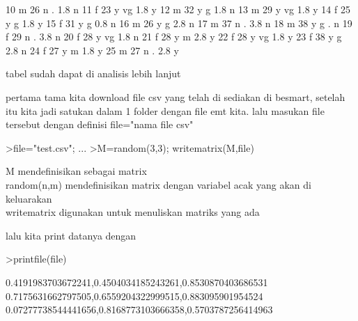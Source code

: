 \documentclass[a4paper,10pt]{article}
\begin{document}
\begin{eulernotebook}
\begin{eulercomment}
\begin{eulercomment}
\begin{eulercomment}
\begin{eulercomment}
\begin{eulercomment}
\begin{eulercomment}
\begin{eulercomment}
\begin{eulercomment}
\begin{euleroutput}
       10    m   26       n          .  1.8       n
       11    f   23       y         vg  1.8       y
       12    m   32       y          g  1.8       n
       13    m   29       y         vg  1.8       y
       14    f   25       y          g  1.8       y
       15    f   31       y          g  0.8       n
       16    m   26       y          g  2.8       n
       17    m   37       n          .  3.8       n
       18    m   38       y          g    .       n
       19    f   29       n          .  3.8       n
       20    f   28       y         vg  1.8       n
       21    f   28       y          m  2.8       y
       22    f   28       y         vg  1.8       y
       23    f   38       y          g  2.8       n
       24    f   27       y          m  1.8       y
       25    m   27       n          .  2.8       y
\end{euleroutput}
\begin{eulercomment}
tabel sudah dapat di analisis lebih lanjut
\end{eulercomment}
\begin{eulercomment}
pertama tama kita download file csv yang telah di sediakan di besmart,
setelah itu kita jadi satukan dalam 1 folder dengan file emt kita.
lalu masukan file tersebut dengan definisi file="nama file csv"
\end{eulercomment}
\begin{eulerprompt}
>file="test.csv";  ...
>M=random(3,3); writematrix(M,file)
\end{eulerprompt}
\begin{eulercomment}
M mendefinisikan sebagai matrix\\
random(n,m) mendefinisikan matrix dengan variabel acak yang akan di
keluarakan\\
writematrix digunakan untuk menuliskan matriks yang ada

lalu kita print datanya dengan
\end{eulercomment}
\begin{eulerprompt}
>printfile(file)
\end{eulerprompt}
\begin{euleroutput}
  0.4191983703672241,0.4504034185243261,0.8530870403686531
  0.7175631662797505,0.6559204322999515,0.883095901954524
  0.07277738544441656,0.8168773103666358,0.5703787256414963
  

\end{euleroutput}
\end{eulercomment}
\end{eulercomment}
\end{eulercomment}
\end{eulercomment}
\end{eulercomment}
\end{eulercomment}
\end{eulercomment}
\end{eulercomment}
\end{eulernotebook}
\end{document}
